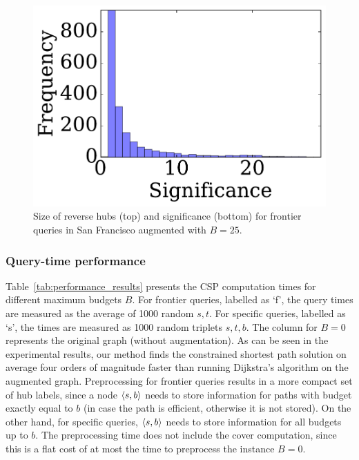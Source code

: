 \begin{figure}
\begin{minipage}[t]{.47\textwidth}
\includegraphics[clip, trim = 0.1cm 0.3cm 0cm 0cm,scale=0.3]{TexImg/significance.pdf}
\caption{Size of reverse hubs (top) and significance (bottom) for frontier queries in San Francisco augmented with $B=25$.}
\label{fig:SF_bwd_size}
\end{minipage}
\end{figure}

\subsubsection{Query-time performance}


Table~\ref{tab:performance_results} presents the CSP computation times for different maximum budgets $B$. 
For frontier queries, labelled as `f', the query times are measured as the average of 1000 random $s,t$.
For specific queries, labelled as `s', the times are measured as 1000 random triplets $s,t,b$.
The column for $B=0$ represents the original graph (without augmentation). 
As can be seen in the experimental results, our method finds the constrained shortest path solution on average four orders of magnitude faster than running Dijkstra's algorithm on the augmented graph. 
Preprocessing for frontier queries results in a more compact set of hub labels, since a node $\langle s,b\rangle$ needs to store information for paths with budget exactly equal to $b$ (in case the path is efficient, otherwise it is not stored).
On the other hand, for specific queries, $\langle s,b\rangle$ needs to store information for all budgets up to $b$.
The preprocessing time does not include the cover computation, since this is a flat cost of at most the time to preprocess the instance $B=0$.

